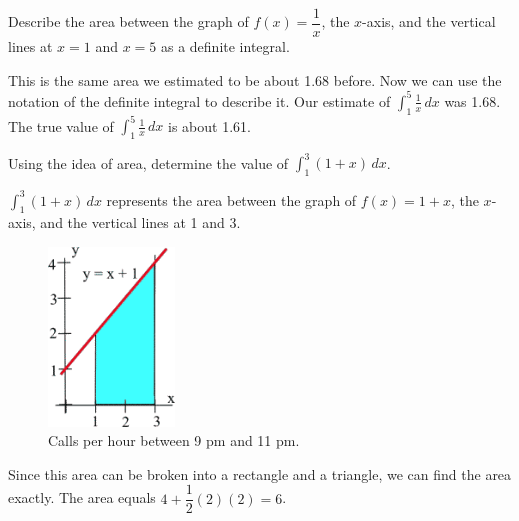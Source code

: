 \begin{example}
Describe the area between the graph of $f(x)=\dfrac{1}{x}$, the $x$-axis, and the vertical lines at $x=1$ and $x=5$ as a definite integral.

\begin{solution}
This is the same area we estimated to be about 1.68 before. Now we can use the notation of the definite integral to describe it. Our estimate of $\displaystyle\int_1^5\frac{1}{x}\,dx$ was 1.68. The true value of $\displaystyle\int_1^5\frac{1}{x}\,dx$ is about 1.61.
\end{solution}\end{example}

\begin{example}
Using the idea of area, determine the value of $\displaystyle\int_1^3(1+x)\,dx$.

\begin{solution}
  $\displaystyle\int_1^3(1+x)\,dx$ represents the area between the graph of $f(x)=1+x$, the $x$-axis, and the vertical lines at 1 and 3.

  \begin{figure}[!ht]
    \centering
      \includegraphics[width=0.3\textwidth]{img/chap5/image011.png}
      \caption{Calls per hour between 9 pm and 11 pm.}
      \label{fig:5-3-1plusx}
  \end{figure}
Since this area can be broken into a rectangle and a triangle, we can find the area exactly. The area equals
$4+\dfrac{1}{2}(2)(2)=6$.
\end{solution}\end{example}

